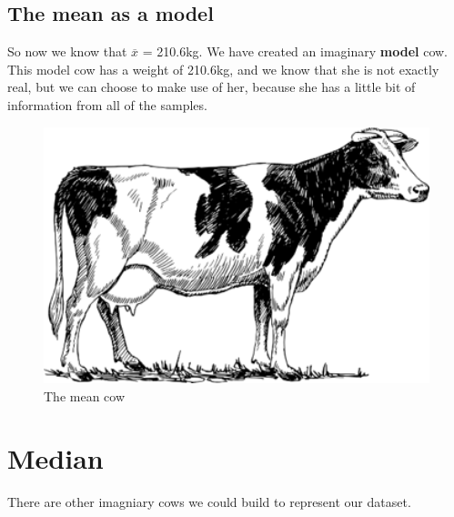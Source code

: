 \documentclass[
]{book}
\newenvironment{Shaded}{\begin{snugshade}}{\end{snugshade}}
\newcommand{\DataTypeTok}[1]{\textcolor[rgb]{0.13,0.29,0.53}{#1}}
\newcommand{\KeywordTok}[1]{\textcolor[rgb]{0.13,0.29,0.53}{\textbf{#1}}}
\newcommand{\NormalTok}[1]{#1}
\newcommand{\OperatorTok}[1]{\textcolor[rgb]{0.81,0.36,0.00}{\textbf{#1}}}
\newcommand{\StringTok}[1]{\textcolor[rgb]{0.31,0.60,0.02}{#1}}
\begin{document}
\hypertarget{the-mean-as-a-model}{%
\subsection{The mean as a model}\label{the-mean-as-a-model}}

So now we know that \(\overline{x}\) = 210.6kg. We have created an imaginary \textbf{model} cow. This model cow has a weight of 210.6kg, and we know that she is not exactly real, but we can choose to make use of her, because she has a little bit of information from all of the samples.

\begin{figure}

{\centering \includegraphics[width=4.88in]{images/09_statbasic/meancow} 

}

\caption{The mean cow}\label{fig:unnamed-chunk-154}
\end{figure}

\hypertarget{stats_median}{%
\section{Median}\label{stats_median}}

There are other imagniary cows we could build to represent our dataset.

\begin{Shaded}
\end{Shaded}
\end{document}

